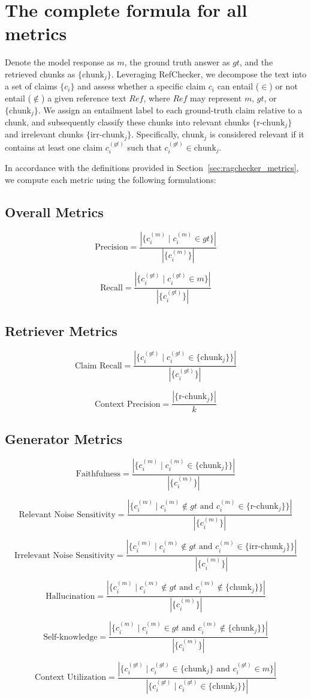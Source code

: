 \section{The complete formula for all metrics}
\label{sec:appendix_formulation}
Denote the model response as $m$, the ground truth answer as $gt$, and the retrieved chunks as $\{\text{chunk}_j\}$. Leveraging RefChecker, we decompose the text into a set of claims $\{c_i\}$ and assess whether a specific claim $c_i$ can entail ($\in$) or not entail ($\notin$) a given reference text $Ref$, where $Ref$ may represent $m$, $gt$, or $\{\text{chunk}_j\}$. We assign an entailment label to each ground-truth claim relative to a chunk, and subsequently classify these chunks into relevant chunks $\{\text{r-chunk}_j\} $ and irrelevant chunks $\{\text{irr-chunk}_j\}$. Specifically, $\text{chunk}_j$ is considered relevant if it contains at least one claim $c^{(gt)}_i$ such that $c^{(gt)}_i \in \text{chunk}_j$.

In accordance with the definitions provided in Section~\ref{sec:ragchecker_metrics}, we compute each metric using the following formulations:

\subsection{Overall Metrics}
$$\text{Precision}=\frac{|\{c^{(m)}_i \mid c^{(m)}_i \in gt\}|}{|\{c^{(m)}_i\}|}$$

$$\text{Recall}=\frac{|\{c^{(gt)}_i \mid c^{(gt)}_i \in m\}|}{|\{c^{(gt)}_i\}|}$$
\subsection{Retriever Metrics}
$$\text{Claim Recall}=\frac{|\{c^{(gt)}_i \mid c^{(gt)}_i \in \{\text{chunk}_j\}\}|}{|\{c^{(gt)}_i\}|}$$

$$\text{Context Precision}=\frac{|\{\text{r-chunk}_j\}|}{k}$$
\subsection{Generator Metrics}
$$\text{Faithfulness}=\frac{|\{c^{(m)}_i \mid c^{(m)}_i\in\{\text{chunk}_j\}\}|}{|\{c^{(m)}_i\}|}$$

$$\text{Relevant Noise Sensitivity}=\frac{|\{c^{(m)}_i \mid c^{(m)}_i \notin gt \text{ and } c^{(m)}_i\in\{\text{r-chunk}_j\}\}|}{|\{c^{(m)}_i\}|}$$

$$\text{Irrelevant Noise Sensitivity}=\frac{|\{c^{(m)}_i \mid c^{(m)}_i \notin gt \text{ and } c^{(m)}_i\in\{\text{irr-chunk}_j\}\}|}{|\{c^{(m)}_i\}|}$$


$$\text{Hallucination}=\frac{|\{c^{(m)}_i \mid c^{(m)}_i \notin gt \text{ and } c^{(m)}_i\notin\{\text{chunk}_j\}\}|}{|\{c^{(m)}_i\}|}$$

$$\text{Self-knowledge}=\frac{|\{c^{(m)}_i \mid c^{(m)}_i \in gt \text{ and } c^{(m)}_i\notin\{\text{chunk}_j\}\}|}{|\{c^{(m)}_i\}|}$$

$$\text{Context Utilization}=\frac{|\{c^{(gt)}_i \mid c^{(gt)}_i\in\{\text{chunk}_j\} \text{ and } c^{(gt)}_i \in m\}|}{|\{c^{(gt)}_i \mid c^{(gt)}_i\in\{\text{chunk}_j\}\}|}$$
